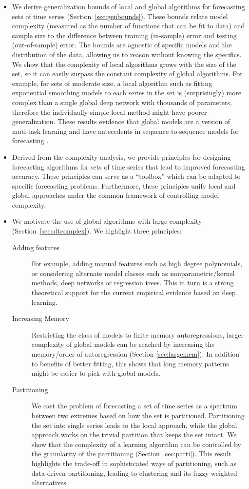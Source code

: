 \documentclass[a4paper]{article}
\theoremstyle{custom}
\begin{document}
\begin{itemize}
\item We derive generalization bounds of local and global algorithms for forecasting sets of time series (Section~\ref{sec:genbounds}).
These bounds relate model complexity (measured as the number of functions that can be fit to data) and sample size to the difference between training (in-sample) error and testing (out-of-sample) error.
The bounds are agnostic of specific models and the distribution of the data, allowing us to reason without knowing the specifics.
We show that the complexity of local algorithms grows with the size of the set, so it can easily surpass the constant complexity of global algorithms. For example, for sets of moderate size, a local algorithm such as fitting exponential smoothing models to each series in the set is (surprisingly) more complex than a single global deep network with thousands of parameters, therefore the individually simple local method might have poorer generalization.
 These results evidence that global models are a version of muti-task learning \cite{zhang2015multi} and have antecedents in sequence-to-sequence models for forecasting \cite{mariet2019foundations}.
\item Derived from the complexity analysis, we provide principles for designing forecasting algorithms for sets of time series that lead to improved forecasting accuracy.
These principles can serve as a ``toolbox'' which can be adapted to specific forecasting problems.
Furthermore, these principles unify local and global approaches under the common framework of controlling model complexity.
\item We motivate the use of global algorithms with large complexity (Section~\ref{sec:altcomplex}). We highlight three principles:
\begin{description}
  \item[Adding features] For example, adding manual features such as high degree polynomials, or considering alternate model classes such as nonparametric/kernel methods, deep networks or regression trees. This in turn is a strong theoretical support for the current empirical evidence based on deep learning.
  \item[Increasing Memory] Restricting the class of models to finite memory autoregressions, larger complexity of global models can be reached by increasing the memory/order of autoregression (Section \ref{sec:largemem}). In addition to benefits of better fitting, this shows that long memory patterns might be easier to pick with global models.
  \item[Partitioning] We cast the problem of forecasting a set of time series as a spectrum between two extremes based on how the set is partitioned. Partitioning the set into single series leads to the local approach, while the global approach works on the trivial partition that keeps the set intact. We show that the complexity of a learning algorithm can be controlled by the granularity of the partitioning (Section~\ref{sec:parti}). This result highlights the trade-off in sophisticated ways of partitioning, such as data-driven partitioning, leading to clustering and its fuzzy weighted alternatives.
\end{description}


\end{itemize}
\end{document}
